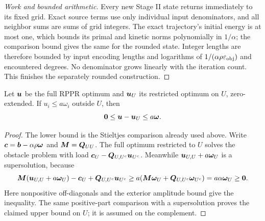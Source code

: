 \begin{proof}[Work and bounded arithmetic]
Every new Stage II state returns immediately to its fixed grid. Exact
source terms use only individual input denominators, and all neighbor sums
are sums of grid integers. The exact trajectory's initial energy is at
most one, which bounds its primal and kinetic norms polynomially in
$1/\alpha$; the comparison bound gives the same for the rounded state.
Integer lengths are therefore bounded by input encoding lengths and
logarithms of $1/(\alpha\rho\varepsilon_{\mathrm{obj}})$ and encountered degrees.
No denominator grows linearly with the iteration count. This finishes
the separately rounded construction.
\end{proof}

\begin{lemma}
\label{lem:revisit-obstacle-face-error}
Let $\bm{u}$ be the full RPPR optimum and $\bm{u}_U$ its restricted optimum
on $U$, zero-extended. If $u_i\leq a\omega_i$ outside $U$, then
\[
 \bm{0}\leq\bm{u}-\bm{u}_U\leq a\bm{\omega}.
\]
\end{lemma}
\begin{proof}
The lower bound is the Stieltjes comparison already used above. Write
$\bm{c}=\bm{b}-\alpha\rho\bm{\omega}$ and $\bm{M}=\bm{Q}_{UU}$.
The full optimum restricted to $U$ solves the obstacle problem with load
$\bm{c}_U-\bm{Q}_{U,U^c}\bm{u}_{U^c}$. Meanwhile
$\bm{u}_{U,U}+a\bm{\omega}_U$ is a supersolution, because
\[
 \bm{M}(\bm{u}_{U,U}+a\bm{\omega}_U)-\bm{c}_U
                +\bm{Q}_{U,U^c}\bm{u}_{U^c}
 \geq a(\bm{M}\bm{\omega}_U+\bm{Q}_{U,U^c}\bm{\omega}_{U^c})
 =a\alpha\bm{\omega}_U\geq\bm{0}.
\]
Here nonpositive off-diagonals and the exterior amplitude bound give the
inequality. The same positive-part comparison with a supersolution proves
the claimed upper bound on $U$; it is assumed on the complement.
\end{proof}

